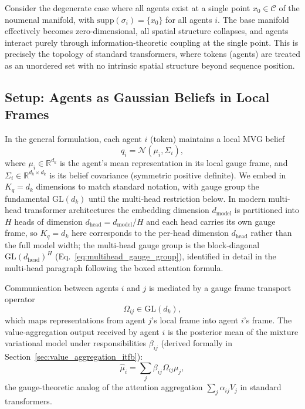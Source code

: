 Consider the degenerate case where all agents exist at a single point $x_0 \in \mathcal{C}$ of the noumenal manifold, with $\mathrm{supp}(\sigma_i) = \{x_0\}$ for all agents $i$. The base manifold effectively becomes zero-dimensional, all spatial structure collapses, and agents interact purely through information-theoretic coupling at the single point. This is precisely the topology of standard transformers, where tokens (agents) are treated as an unordered set with no intrinsic spatial structure beyond sequence position.

\subsection{Setup: Agents as Gaussian Beliefs in Local Frames}

In the general formulation, each agent $i$ (token) maintains a local MVG belief
\begin{equation}
q_i = \mathcal{N}(\mu_i, \Sigma_i),
\end{equation}
where $\mu_i \in \mathbb{R}^{d_k}$ is the agent's mean representation in its local gauge frame, and $\Sigma_i \in \mathbb{R}^{d_k\times d_k}$ is its belief covariance (symmetric positive definite). We embed in $K_q = d_k$ dimensions to match standard notation, with gauge group the fundamental $\mathrm{GL}(d_k)$ until the multi-head restriction below. In modern multi-head transformer architectures the embedding dimension $d_{\text{model}}$ is partitioned into $H$ heads of dimension $d_{\text{head}} = d_{\text{model}}/H$ and each head carries its own gauge frame, so $K_q=d_k$ here corresponds to the per-head dimension $d_{\text{head}}$ rather than the full model width; the multi-head gauge group is the block-diagonal $\mathrm{GL}(d_{\text{head}})^H$ (Eq.~\eqref{eq:multihead_gauge_group}), identified in detail in the multi-head paragraph following the boxed attention formula.

Communication between agents $i$ and $j$ is mediated by a gauge frame transport operator
\begin{equation}
\Omega_{ij} \in \mathrm{GL}(d_k),
\end{equation}
which maps representations from agent $j$'s local frame into agent $i$'s frame. The value-aggregation output received by agent $i$ is the posterior mean of the mixture variational model under responsibilities $\beta_{ij}$ (derived formally in Section~\ref{sec:value_aggregation_itfb}):
\begin{equation}
\hat\mu_i = \sum_j \beta_{ij} \Omega_{ij}\mu_j,
\end{equation}
the gauge-theoretic analog of the attention aggregation $\sum_j \alpha_{ij} V_j$ in standard transformers.

